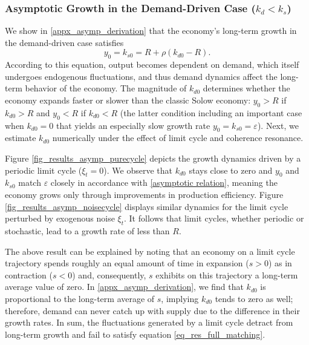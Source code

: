 \documentclass[authoryear, review]{elsarticle}
\begin{document}
\subsubsection{Asymptotic Growth in the Demand-Driven Case ($k_d<k_s$)}\label{sec_results_asymp_dc}

We show in \ref{appx_asymp_derivation} that the economy's long-term growth in the demand-driven case satisfies 
\begin{equation} \label{asymptotic relation}
y_0 = k_{s0} = R + \rho\left(k_{d0} - R\right).
\end{equation}
According to this equation, output becomes dependent on demand, which itself undergoes endogenous fluctuations, and thus demand dynamics affect the long-term behavior of the economy. The magnitude of $k_{d0}$ determines whether the economy expands faster or slower than the classic Solow economy: $y_0>R$ if $k_{d0}>R$ and $y_0<R$ if $k_{d0}<R$ (the latter condition including an important case when $k_{d0}=0$ that yields an especially slow growth rate $y_0 = k_{s0} = \varepsilon$). Next, we estimate $k_{d0}$ numerically under the effect of limit cycle and coherence resonance.

Figure \ref{fig_results_asymp_purecycle} depicts the growth dynamics driven by a periodic limit cycle ($\xi_t=0$). We observe that $k_{d0}$ stays close to zero and $y_0$ and $k_{s0}$ match $\varepsilon$ closely in accordance with \eqref{asymptotic relation}, meaning the economy grows only through improvements in production efficiency. Figure \ref{fig_results_asymp_noisecycle} displays similar dynamics for the limit cycle perturbed by exogenous noise $\xi_t$. It follows that limit cycles, whether periodic or stochastic, lead to a growth rate of less than $R$. 

The above result can be explained by noting that an economy on a limit cycle trajectory spends roughly an equal amount of time in expansion ($s>0$) as in contraction ($s<0$) and, consequently, $s$ exhibits on this trajectory a long-term average value of zero. In \ref{appx_asymp_derivation}, we find that $k_{d0}$ is proportional to the long-term average of $s$, implying $k_{d0}$ tends to zero as well; therefore, demand can never catch up with supply due to the difference in their growth rates. In sum, the fluctuations generated by a limit cycle detract from long-term growth and fail to satisfy equation \eqref{eq_res_full_matching}.
\end{document}
